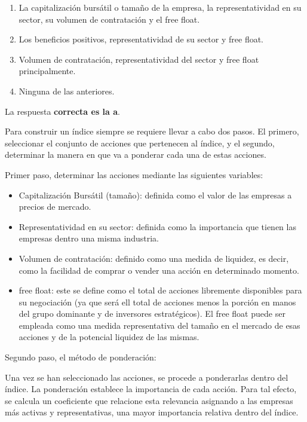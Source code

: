 \documentclass[
  letterpaper,
  DIV=11,
  numbers=noendperiod]{scrreprt}
\begin{document}
\begin{enumerate}
\def\labelenumi{\alph{enumi})}
\item
  La capitalización bursátil o tamaño de la empresa, la
  representatividad en su sector, su volumen de contratación y el free
  float.
\item
  Los beneficios positivos, representatividad de su sector y free float.
\item
  Volumen de contratación, representatividad del sector y free float
  principalmente.
\item
  Ninguna de las anteriores.
\end{enumerate}

\begin{tcolorbox}[enhanced jigsaw, left=2mm, opacityback=0, colback=white, breakable, arc=.35mm, bottomrule=.15mm, rightrule=.15mm, toprule=.15mm, leftrule=.75mm, colframe=quarto-callout-tip-color-frame]
\begin{minipage}[t]{5.5mm}
\textcolor{quarto-callout-tip-color}{\faLightbulb}
\end{minipage}%
\begin{minipage}[t]{\textwidth - 5.5mm}

La respuesta \textbf{correcta es la a}.

Para construir un índice siempre se requiere llevar a cabo dos pasos. El
primero, seleccionar el conjunto de acciones que pertenecen al índice, y
el segundo, determinar la manera en que va a ponderar cada una de estas
acciones.

Primer paso, determinar las acciones mediante las siguientes variables:

\begin{itemize}
\item
  Capitalización Bursátil (tamaño): definida como el valor de las
  empresas a precios de mercado.
\item
  Representatividad en su sector: definida como la importancia que
  tienen las empresas dentro una misma industria.
\item
  Volumen de contratación: definido como una medida de liquidez, es
  decir, como la facilidad de comprar o vender una acción en determinado
  momento.
\item
  free float: este se define como el total de acciones libremente
  disponibles para su negociación (ya que será ell total de acciones
  menos la porción en manos del grupo dominante y de inversores
  estratégicos). El free float puede ser empleada como una medida
  representativa del tamaño en el mercado de esas acciones y de la
  potencial liquidez de las mismas.
\end{itemize}

Segundo paso, el método de ponderación:

Una vez se han seleccionado las acciones, se procede a ponderarlas
dentro del índice. La ponderación establece la importancia de cada
acción. Para tal efecto, se calcula un coeficiente que relacione esta
relevancia asignando a las empresas más activas y representativas, una
mayor importancia relativa dentro del índice.

\end{minipage}%
\end{tcolorbox}
\end{document}
